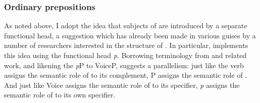 \begin{exe}
\begin{xlist}
\begin{xlist}
\begin{exe}
\begin{xlist}
\begin{xlist}
\begin{exe}
\begin{xlist}
\begin{xlist}
\begin{exe}
\begin{exe}
\begin{xlist}
\begin{exe}
\begin{exe}
\begin{xlist}
\begin{exe}
\begin{exe}
\begin{exe}
\begin{exe}
\begin{exe}
\begin{xlist}
\begin{exe}
\begin{xlist}
\begin{exe}
\begin{exe}
\begin{xlist}
\begin{exe}
\begin{xlist}
\begin{exe}
\begin{xlist}
\begin{exe}
\begin{exe}
\begin{exe}
\begin{xlist}
\begin{exe}
\begin{exe}
\begin{exe}
\begin{xlist}
\begin{exe}
\begin{xlist}
\begin{exe}
\begin{xlist}
\begin{exe}
\begin{xlist}
\begin{exe}
\begin{exe}
\begin{exe}
\begin{exe}
\begin{xlist}
\begin{exe}
\begin{xlist}
\begin{exe}
\begin{xlist}
		\subsubsection{Ordinary prepositions}
As noted above, I adopt the idea that subjects of  are introduced by a separate functional head, a suggestion which has already been made in various guises by a number of researchers interested in the structure of  \citep{vanriemsdijk90,rooryck96,koopman97,gehrke08phd,dendikken03,dendikken10}. In particular, \cite{svenonius03,svenonius07,svenonius10} implements this idea using the functional head \emph{p}. Borrowing terminology from \cite{talmy78} and related work, and likening the \emph{p}P to VoiceP, \cite{wood14nllt,wood15springer} suggests a parallelism: just like the verb assigns the semantic role of  to its complement, P assigns the semantic role of \textsc{}. And just like Voice assigns the semantic role of  to its specifier, \emph{p} assigns the semantic role of \textsc{} to its own specifier.


\end{xlist}
\end{exe}
\end{xlist}
\end{exe}
\end{xlist}
\end{exe}
\end{exe}
\end{exe}
\end{exe}
\end{xlist}
\end{exe}
\end{xlist}
\end{exe}
\end{xlist}
\end{exe}
\end{xlist}
\end{exe}
\end{exe}
\end{exe}
\end{xlist}
\end{exe}
\end{exe}
\end{exe}
\end{xlist}
\end{exe}
\end{xlist}
\end{exe}
\end{xlist}
\end{exe}
\end{exe}
\end{xlist}
\end{exe}
\end{xlist}
\end{exe}
\end{exe}
\end{exe}
\end{exe}
\end{exe}
\end{xlist}
\end{exe}
\end{exe}
\end{xlist}
\end{exe}
\end{exe}
\end{xlist}
\end{xlist}
\end{exe}
\end{xlist}
\end{xlist}
\end{exe}
\end{xlist}
\end{xlist}
\end{exe}
